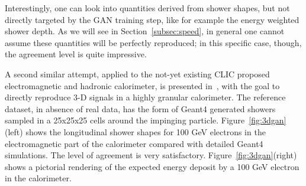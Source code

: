 Interestingly, one can look into quantities derived from shower shapes, but not directly targeted by the GAN training step, like for example the energy weighted shower depth. As we will see in Section~\ref{subsec:speed}, in general one cannot assume these quantities will be perfectly reproduced; in this specific case, though, the agreement level is quite impressive.


A second similar attempt, applied to the not-yet existing CLIC proposed electromagnetic and hadronic calorimeter, is presented in~\cite{Carminati2018}, with the goal to directly reproduce 3-D signals in a highly granular calorimeter. The reference dataset, in absence of real data, has the form of Geant4 generated showers sampled in a 25x25x25 cells around the impinging particle.
Figure~\ref{fig:3dgan}(left) shows the longitudinal shower shapes for 100 GeV electrons in the electromagnetic part of the calorimeter compared with detailed Geant4 simulations. The level of agreement is very satisfactory. Figure~\ref{fig:3dgan}(right) shows a pictorial rendering of the expected energy deposit by a 100 GeV electron in the calorimeter.



